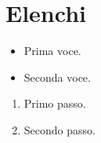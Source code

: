 \documentclass[a4paper,11pt]{article} %
\begin{document}


\section{Elenchi} %
\begin{itemize} %
  \item Prima voce. %
  \item Seconda voce. %
\end{itemize} %
\begin{enumerate} %
  \item Primo passo. %
  \item Secondo passo. %
\end{enumerate} %
\end{document}
